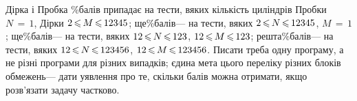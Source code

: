 \begin{problemAllDefault}{Дірка і Пробка}
\%\nolinebreak[3] балів припадає на тести, в\nolinebreak[3] яких кількість циліндрів Пробки ${N\,{=}\,1}$, Дірки ${2\,{\leqslant}\,M\,{\leqslant}\,12345}$;
ще\%\nolinebreak[3] балів\nolinebreak[3] --- на тести, в\nolinebreak[3] яких ${2\,{\leqslant}\,N\,{\leqslant}\,12345}$, ${M\,{=}\,1}$;
ще\%\nolinebreak[3] балів\nolinebreak[3] --- на тести, в\nolinebreak[3] яких $12\dib{{\<}}N\dib{{\<}}123$, $12\dib{{\<}}M\dib{{\<}}123$; 
решта\%\nolinebreak[3] балів\nolinebreak[3] --- на тести, в\nolinebreak[3] яких $12\dib{{\<}}N\dib{{\<}}123456$, $12\dib{{\<}}M\dib{{\<}}123456$.
%
Писати треба одну програму, а не різні програми для різних випадків; єдина мета цього переліку різних блоків обмежень\nolinebreak[3] --- дати уявлення про те, скільки балів можна отримати, якщо розв’язати задачу частково.




\end{problemAllDefault}